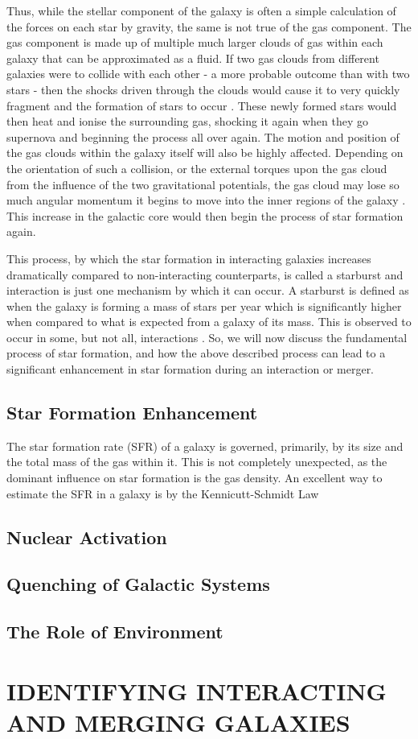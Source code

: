 Thus, while the stellar component of the galaxy is often a simple calculation of the forces on each star by gravity, the same is not true of the gas component. The gas component is made up of multiple much larger clouds of gas within each galaxy that can be approximated as a fluid. If two gas clouds from different galaxies were to collide with each other - a more probable outcome than with two stars - then the shocks driven through the clouds would cause it to very quickly fragment and the formation of stars to occur \citep{Papers on fragmentation of gas in interaction, paper on star formation in star fragments}. These newly formed stars would then heat and ionise the surrounding gas, shocking it again when they go supernova and beginning the process all over again. The motion and position of the gas clouds within the galaxy itself will also be highly affected. Depending on the orientation of such a collision, or the external torques upon the gas cloud from the influence of the two gravitational potentials, the gas cloud may lose so much angular momentum it begins to move into the inner regions of the galaxy \citep{Need a paper which talks about torques on gas in a system and the feedback involved here.}. This increase in the galactic core would then begin the process of star formation again. 

This process, by which the star formation in interacting galaxies increases dramatically compared to non-interacting counterparts, is called a starburst and interaction is just one mechanism by which it can occur. A starburst is defined as when the galaxy is forming a mass of stars per year which is significantly higher when compared to what is expected from a galaxy of its mass. This is observed to occur in some, but not all, interactions \citep{Review paper on starbursts in galaxies}. So, we will now discuss the fundamental process of star formation, and how the above described process can lead to a significant enhancement in star formation during an interaction or merger.


\subsection{Star Formation Enhancement} 
\noindent The star formation rate (SFR) of a galaxy is governed, primarily, by its size and the total mass of the gas within it. This is not completely unexpected, as the dominant influence on star formation is the gas density. An excellent way to estimate the SFR in a galaxy is by the Kennicutt-Schmidt Law \citep{Kennicutt-Schmidt Law Paper}

\subsection{Nuclear Activation}
\subsection{Quenching of Galactic Systems}
\subsection{The Role of Environment}

\section{IDENTIFYING INTERACTING AND MERGING GALAXIES}
